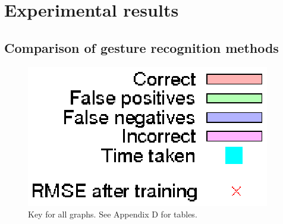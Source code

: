 \documentclass[12pt,a4,notitlepage]{report}
\renewcommand{\_}{\texttt{\symbol{95}}}
\newcommand{\<}{\texttt{\symbol{60}}}
\renewcommand{\>}{\texttt{\symbol{62}}}
\begin{document}
\section{Experimental results}

\subsection{Comparison of gesture recognition methods}

\begin{figure}
\centering
\includegraphics[scale=0.7,angle=0]{results/key.ps}
\caption{Key for all graphs. See Appendix D for tables.}
\label{key}
\end{figure}
\end{document}
